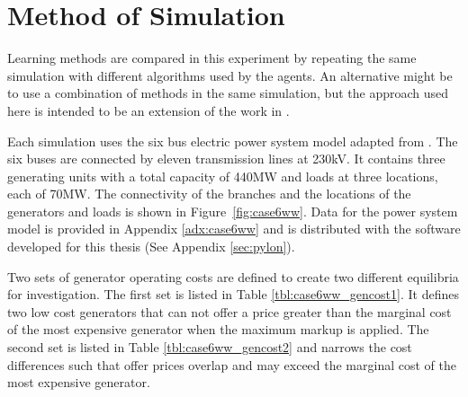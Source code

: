 \section{Method of Simulation}
Learning methods are compared in this experiment by repeating the same
simulation with different algorithms used by the agents.  An alternative
might be to use a combination of methods in the same simulation, but the
approach used here is intended to be an extension of the work in
.

Each simulation uses the six bus electric power system model adapted from
.  The six buses are
connected by eleven transmission lines at 230kV.  It contains three generating
units with a total capacity of 440MW and loads at three locations, each of
70MW. The connectivity of the branches and the locations of the generators and
loads is shown in Figure~\ref{fig:case6ww}.  Data for the power system model is
provided in Appendix \ref{adx:case6ww} and is distributed with the software
developed for this thesis (See Appendix \ref{sec:pylon}).

Two sets of generator operating costs are defined to create two different
equilibria for investigation. The first set is listed in Table
\ref{tbl:case6ww_gencost1}. It defines two low cost generators that can not
offer a price greater than the marginal cost of the most expensive generator
when the maximum markup is applied.  The second set is listed in Table
\ref{tbl:case6ww_gencost2} and narrows the cost differences such that offer
prices overlap and may exceed the marginal cost of the most expensive
generator.

